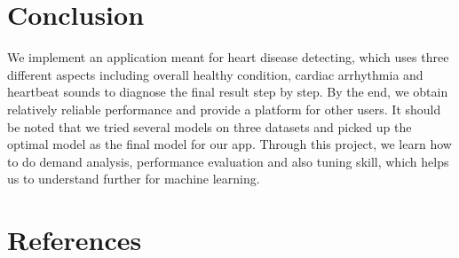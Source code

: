 \documentclass[letterpaper]{article} %
\begin{document}
\section{Conclusion}

We implement an application meant for heart disease detecting, which uses three different aspects including overall healthy condition, cardiac arrhythmia and heartbeat sounds to diagnose the final result step by step. By the end, we obtain relatively reliable performance and provide a platform for other users. It should be noted that we tried several  models on three datasets and picked up the optimal model as the final model for our app. Through this project, we learn how to do demand analysis, performance evaluation and also tuning skill, which helps us to understand further for machine learning.

\section{References}
\end{document}
